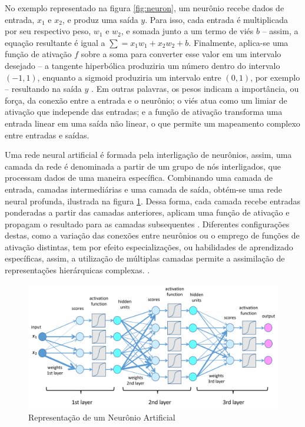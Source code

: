 No exemplo representado na figura \ref{fig:neuron}, um neurônio recebe dados de entrada, $x_1$ e $x_2$, e produz uma saída $y$. Para isso, cada entrada é multiplicada por seu respectivo peso, $w_1$ e $w_2$, e somada junto a um termo de viés $b$ -- assim, a equação resultante é igual a $\sum = x_1 w_1 + x_2 w_2 + b$. Finalmente, aplica-se uma função de ativação $f$ sobre a soma para converter esse valor em um intervalo desejado -- a tangente hiperbólica produziria um número dentro do intervalo $(-1, 1)$, enquanto a sigmoid produziria um intervalo entre $(0, 1)$, por exemplo -- resultando na saída $y$ \cite{deeplearningbook}. Em outras palavras, os pesos indicam a importância, ou força, da conexão entre a entrada e o neurônio; o viés atua como um limiar de ativação que independe das entradas; e a função de ativação transforma uma entrada linear em uma saída não linear, o que permite um mapeamento complexo entre entradas e saídas. 

Uma rede neural artificial é formada pela interligação de neurônios, assim, uma camada da rede é denominada a partir de um grupo de nós interligados, que processam dados de uma maneira específica. Combinando uma camada de entrada, camadas intermediárias e uma camada de saída, obtém-se uma rede neural profunda, ilustrada na figura \ref{fig:dnn}. Dessa forma, cada camada recebe entradas ponderadas a partir das camadas anteriores, aplicam uma função de ativação e propagam o resultado para as camadas subsequentes \cite{deeplearningbook}. Diferentes configurações destas, como a variação das conexões entre neurônios ou o emprego de funções de ativação distintas, tem por efeito especializações, ou habilidades de aprendizado específicas, assim, a utilização de múltiplas camadas permite a assimilação de representações hierárquicas complexas. \cite{reviewdeep}.

\begin{figure}[H]
	\caption{\label{fig:dnn}Representação de um Neurônio Artificial}
    \begin{center}
    \includegraphics[width=1\linewidth]{images/dnn.png}
	\end{center}
\end{figure}


